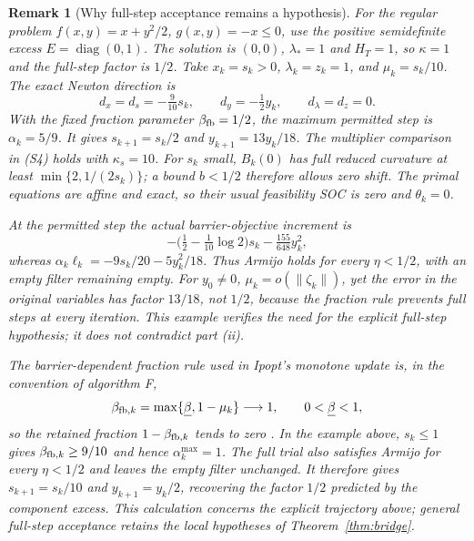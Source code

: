 \documentclass[pdflatex,sn-mathphys-num]{sn-jnl}
\theoremstyle{thmstyleone}
\theoremstyle{thmstylethree}
\newtheorem{remark}[theorem]{Remark}
\newcounter{algorithm}
\begin{document}
\begin{remark}[Why full-step acceptance remains a hypothesis]
For the regular problem
$f(x,y)=x+y^2/2$, $g(x,y)=-x\leq0$, use the positive semidefinite
excess $E=\operatorname{diag}(0,1)$.
The solution is $(0,0)$, $\lambda_*=1$ and $H_T=1$, so
$\kappa=1$ and the full-step factor is $1/2$.
Take $x_k=s_k>0$, $\lambda_k=z_k=1$, and
$\mu_k=s_k/10$. The exact Newton direction is
\[
 d_x=d_s=-\tfrac9{10}s_k,\qquad
 d_y=-\tfrac12y_k,\qquad d_\lambda=d_z=0.
\]
With the fixed fraction parameter $\beta_{\rm fb}=1/2$, the
maximum permitted step is $\alpha_k=5/9$. It gives
$s_{k+1}=s_k/2$ and $y_{k+1}=13y_k/18$.
The multiplier comparison in (S4) holds with $\kappa_s=10$.
For $s_k$ small, $B_k(0)$ has full reduced curvature at least
$\min\{2,1/(2s_k)\}$; a bound $b<1/2$ therefore allows zero shift.
The primal equations are affine and exact, so their usual
feasibility SOC is zero and $\theta_k=0$.

At the permitted step the actual barrier-objective increment is
\[
 -\bigl(\tfrac12-\tfrac1{10}\log2\bigr)s_k
       -\tfrac{155}{648}y_k^2,
\]
whereas $\alpha_k\ell_k=-9s_k/20-5y_k^2/18$.
Thus Armijo holds for every $\eta<1/2$, with an empty filter
remaining empty. For $y_0\ne0$,
$\mu_k=o(\|\zeta_k\|)$, yet the error in the original variables has factor $13/18$,
not $1/2$, because the fraction rule prevents full steps at every
iteration. This example verifies the need for the explicit full-step
hypothesis; it does not contradict part (ii).

\smallskip
The barrier-dependent fraction rule used in Ipopt's monotone update is,
in the convention of algorithm F,
\[
 \beta_{{\rm fb},k}=\max\{\underline\beta,1-\mu_k\}\longrightarrow1,
 \qquad 0<\underline\beta<1,
\]
so the retained fraction $1-\beta_{{\rm fb},k}$ tends to zero
\citep[eqs.~(8) and (15)]{WachterBiegler2006}.
In the example above, $s_k\leq1$ gives
$\beta_{{\rm fb},k}\geq9/10$ and hence $\alpha_k^{\max}=1$.
The full trial also satisfies Armijo for every $\eta<1/2$ and leaves
the empty filter unchanged. It therefore gives
$s_{k+1}=s_k/10$ and $y_{k+1}=y_k/2$, recovering the factor $1/2$
predicted by the component excess. This calculation concerns the
explicit trajectory above; general full-step acceptance retains the
local hypotheses of Theorem~\ref{thm:bridge}.

\end{remark}
\end{document}
